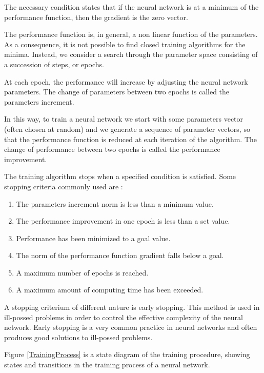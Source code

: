 The necessary condition states that if the neural network is at a minimum of the performance function, 
then the gradient is the zero vector. 

The performance function is, in general, a non linear function of the
parameters. As a consequence, it is not possible to find closed
training algorithms for the minima. Instead, we consider a search
through the parameter space consisting of a succession of steps, or
epochs. 

At each epoch, the performance will increase by adjusting the neural network parameters. 
The change of parameters between two epochs is called the parameters increment. 

In this way, to train a neural network we start with some parameters vector 
(often chosen at random) and we generate a sequence of parameter vectors, so
that the performance function is reduced at each iteration of the algorithm. 
The change of performance between two epochs is called the performance improvement. 

The training algorithm stops when a specified condition is satisfied. 
Some stopping criteria commonly used are \cite{Demuth2009}:

\begin{enumerate}
\item The parameters increment norm is less than a minimum value. 
\item The performance improvement in one epoch is less than a set value.
\item Performance has been minimized to a goal value.
\item The norm of the performance function gradient falls below a goal.
\item A maximum number of epochs is reached.
\item A maximum amount of computing time has been exceeded.
\end{enumerate}

A stopping criterium of different nature is early stopping. 
This method is used in ill-possed problems in order to control the effective complexity of the neural network. 
Early stopping is a very common practice in neural networks and often produces good solutions to ill-possed problems. 

Figure \ref{TrainingProcess} is a state diagram of the training
procedure, showing states and transitions in the training process
of a neural network.

